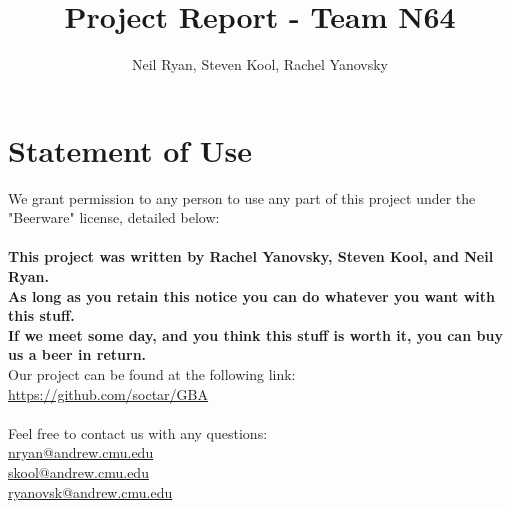 \documentclass[11pt,a4paper]{article}
\begin{document}
	\title{Project Report - Team N64}
	\author{Neil Ryan, Steven Kool, Rachel Yanovsky}
	\maketitle
	\newpage
	\tableofcontents
	\newpage
	
	\section{Statement of Use}
	We grant permission to any person to use any part of this project under the "Beerware" license, detailed below:\\\\
	\textbf{This project was written by Rachel Yanovsky, Steven Kool, and Neil Ryan.\\As long as you retain this notice you
	can do whatever you want with this stuff. \\
	If we meet some day, and you think this stuff is worth it, you can buy us a beer in return.} \\
	
	
	Our project can be found at the following link:\\
	\url{https://github.com/soctar/GBA}\\\\
	
	Feel free to contact us with any questions:\\
	\href{mailto:nryan@andrew.cmu.edu}{nryan@andrew.cmu.edu}\\
	\href{mailto:skool@andrew.cmu.edu}{skool@andrew.cmu.edu}\\
	\href{mailto:ryanovsk@andrew.cmu.edu}{ryanovsk@andrew.cmu.edu}\\
	\newpage
\end{document}
